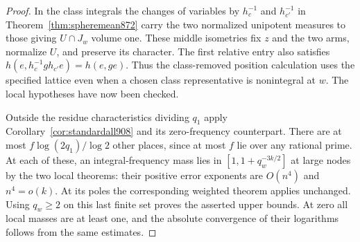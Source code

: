 \documentclass[a4paper,11pt]{article}
\theoremstyle{definition}
\theoremstyle{remark}
\numberwithin{equation}{section}
\begin{document}
\begin{proof}
In the class integrals the changes of variables by \(h_c^{-1}\)
and \(h_{c'}^{-1}\) in Theorem~\ref{thm:spheremean872} carry the
two normalized unipotent measures to those giving \(U\cap J_w\)
volume one. These middle isometries fix \(z\) and the two arms,
normalize \(U\), and preserve its character. The first relative
entry also satisfies
\(h(e,h_c^{-1}g h_{c'}e)=h(e,ge)\).
Thus the class-removed position calculation uses the specified
lattice even when a chosen class representative is nonintegral
at \(w\). The local hypotheses have now been checked.

Outside the residue characteristics dividing \(q_1\) apply
Corollary~\ref{cor:standardall908} and its zero-frequency
counterpart. There are at most \(f\log(2q_1)/\log 2\) other
places, since at most \(f\) lie over any rational prime.
At each of these, an integral-frequency mass lies in
\([1,1+q_w^{-3k/2}]\) at large nodes by the two local theorems:
their positive error exponents are \(O(n^4)\) and \(n^4=o(k)\).
At its poles the corresponding weighted theorem applies unchanged.
Using \(q_w\ge2\) on this last finite set proves the asserted
upper bounds. At zero all local masses are at least one,
and the absolute convergence of their logarithms follows from
the same estimates.
\end{proof}
\end{document}
